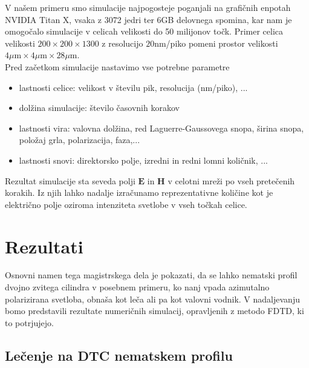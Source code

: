 \documentclass[longbibliography,slovene,a4paper,12pt]{book}
\begin{document}
V našem primeru smo simulacije najpogosteje poganjali na grafičnih enpotah NVIDIA Titan X, vsaka z 3072 jedri ter 6GB delovnega spomina, kar nam je omogočalo simulacije v celicah velikosti do 50 milijonov točk. Primer celica velikosti $200\times200\times 1300$ z resolucijo $20$nm/piko pomeni prostor velikosti $4\mu \text{m}\times 4\mu \text{m} \times 28 \mu\text{m}$.\\

Pred začetkom simulacije nastavimo vse potrebne parametre
\begin{itemize}
\item{lastnosti celice: velikost v številu pik, resolucija (nm/piko), ...}
\item{dolžina simulacije: število časovnih korakov}
\item{lastnosti vira: valovna dolžina, red Laguerre-Gaussovega snopa, širina snopa, položaj grla, polarizacija, faza,...}
\item{lastnosti snovi: direktorsko polje, izredni in redni lomni količnik, ...}
\end{itemize}
Rezultat simulacije sta seveda polji $\mathbf{E}$ in $\mathbf{H}$ v celotni mreži po vseh pretečenih korakih. Iz njih lahko nadalje izračunamo reprezentativne količine kot je električno polje oziroma intenziteta svetlobe v vseh točkah celice.\\

\chapter{Rezultati}

Osnovni namen tega magistrskega dela je pokazati, da se lahko nematski profil dvojno zvitega cilindra v posebnem primeru, ko nanj vpada azimutalno polarizirana svetloba, obnaša kot leča ali pa kot valovni vodnik. V nadaljevanju bomo predstavili rezultate numeričnih simulacij, opravljenih z metodo FDTD, ki to potrjujejo. 

\section{Lečenje na DTC nematskem profilu}
\end{document}
